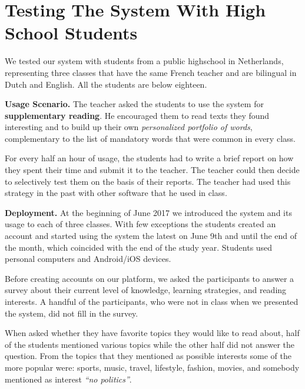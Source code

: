 
\section{Testing The System With High School Students}
\label{sec:demographics}

We tested our system with \stcnt students from a public highschool in Netherlands, representing three classes that have the same French teacher and are bilingual in Dutch and English. All the students are below eighteen.

{\bf Usage Scenario. }
	The teacher asked the students to use the system for {\bf supplementary reading}. 
	He encouraged them to read texts they found interesting and to build up their own {\em personalized portfolio of words}, complementary to the list of mandatory words that were common in every class.
	
	For every half an hour of usage, the students had to write a brief report on how they spent their time and submit it to the teacher. The teacher could then decide to selectively test them on the basis of their reports. 
	The teacher had used this strategy in the past with other software that he used in class. 


{\bf Deployment.} At the beginning of June 2017 we introduced the system and its usage to each of three classes. With few exceptions the students created an account and started using the system the latest on June 9th and until the end of the month, which coincided with the end of the study year. 
Students used personal computers and Android/iOS devices.

Before creating accounts on our platform, we asked the participants to answer a survey about their current level of knowledge, learning strategies, and reading interests. A handful of the participants, who were not in class when we presented the system, did not fill in the survey.

When asked whether they have favorite topics they would like to read about, half of the students mentioned various topics while the other half did not answer the question. From the topics that they mentioned as possible interests some of the more popular were: sports, music, travel, lifestyle, fashion, movies, and somebody mentioned as interest {\em ``no politics''}.


